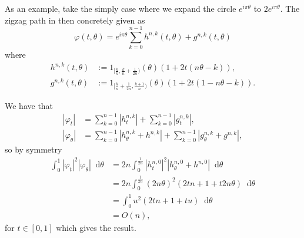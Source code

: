 \documentclass[a4,danish]{article}
\theoremstyle{break}
\theoremstyle{definition}
\theoremstyle{Break}
\renewcommand{\phi}{\varphi}
\newcommand*\diff{\mathop{}\!\mathrm{d}}
\begin{document}
As an example, take the simply case where we expand the circle $e^{i\pi\theta}$ to
$2e^{i\pi\theta}$. The zigzag path in then concretely given as
\begin{equation*}
  \phi(t,\theta) = e^{i\pi\theta}
    \sum_{k=0}^{n-1}
    h^{n,k}(t,\theta) + g^{n,k}(t,\theta)
\end{equation*}
where
\begin{equation*}
  \begin{aligned}
    h^{n,k}(t,\theta) & := 1_{[\frac{k}{n},\frac{k}{n} +
      \frac{1}{2n})}(\theta) \left( 1+2t(n\theta-k) \right), \\
    g^{n,k}(t,\theta) & := 1_{[\frac{k}{n} + \frac{1}{2n},\frac{k+1}{n})}(\theta)
    \left( 1+2t(1-n\theta-k) \right).
  \end{aligned}
\end{equation*}

We have that
\begin{equation*}
  \begin{aligned}
    |\phi_t| & = \sum_{k=0}^{n-1} |h^{n,k}_t| + \sum_{k=0}^{n-1}
    |g^{n,k}_t|, \\
    |\phi_{\theta}| & = \sum_{k=0}^{n-1} |h^{n,k}_{\theta} + h^{n,k} | +
    \sum_{k=0}^{n-1}
    |g^{n,k}_{\theta} + g^{n,k} |,
  \end{aligned}
\end{equation*}
so by symmetry
\begin{equation*}
  \begin{aligned}
    \int_{0}^{1}
    |\phi_t|^2   |\phi_{\theta}|
    \diff \theta
    & =
    2n \int_{0}^{\frac{1}{2n}} |h^{n,0}_t|^2 |h^{n,0}_{\theta} + h^{n,0} |
    \diff \theta \\
    & = 2n \int_{0}^{\frac{1}{2n}}
    (2n\theta)^2(2tn+1+t2n\theta) \diff \theta \\
    & = \int_{0}^1
    u^2(2tn+1+t u) \diff \theta \\
    & = O(n),
  \end{aligned}
\end{equation*}
for $t\in[0,1]$ which gives the result.
\end{document}
